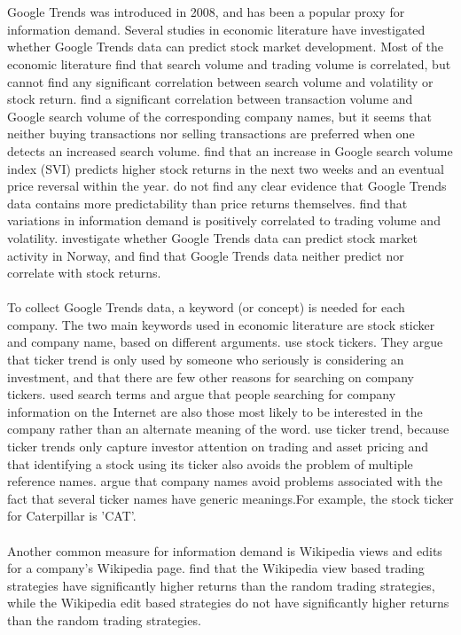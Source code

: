 \\\\
Google Trends was introduced in 2008, and has been a popular proxy for information demand. Several studies in economic literature have investigated whether Google Trends data can predict stock market development. Most of the economic literature find that search volume and trading volume is correlated, but cannot find any significant correlation between search volume and volatility or stock return. \cite{preis} find a significant correlation between transaction volume and Google search volume of the corresponding company names, but it seems that neither buying transactions nor selling transactions are preferred when one detects an increased search volume. \cite{engelberg} find that an increase in Google search volume index (SVI) predicts higher stock returns in the next two weeks and an eventual price reversal within the year. \cite{challet2014} do not find any clear evidence that Google Trends data contains more predictability than price returns themselves. \cite{vlastakis} find that variations in information demand is positively correlated to trading volume and volatility. \cite{neri} investigate whether Google Trends data can predict stock market activity in Norway, and find that Google Trends data neither predict nor correlate with stock returns. 
\\\\
To collect Google Trends data, a keyword (or concept) is needed for each company. The two main keywords used in economic literature are stock sticker and company name, based on different arguments. \cite{joseph} use stock tickers. They argue that ticker trend is only used by someone who seriously is considering an investment, and that there are few other reasons for searching on company tickers. \cite{bijl} used search terms and argue that people searching for company information on the Internet are also those most likely to be interested in the company rather than an alternate meaning of the word. \cite{engelberg} use ticker trend, because ticker trends only capture investor attention on trading and asset pricing and that identifying a stock using its ticker also avoids the problem of multiple reference names. \cite{vlastakis} argue that company names avoid problems associated with the fact that several ticker names have generic meanings.For example, the stock ticker for Caterpillar is 'CAT'.
\\\\
Another common measure for information demand is Wikipedia views and edits for a company's Wikipedia page. \cite{moat} find that the Wikipedia view based trading strategies have significantly higher returns than the random trading strategies, while the Wikipedia edit based strategies do not have significantly higher returns than the random trading strategies. 

